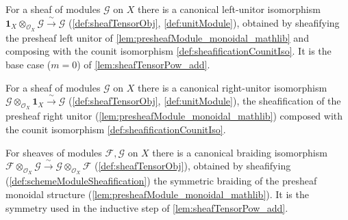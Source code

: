 \begin{definition}
  \label{def:tensorObjUnitIso}
  For a sheaf of modules \(\mathcal{G}\) on \(X\) there is a canonical left-unitor
  isomorphism \(\mathbf{1}_X \otimes_{\mathcal{O}_X} \mathcal{G}
  \xrightarrow{\ \sim\ } \mathcal{G}\) (\cref{def:sheafTensorObj},
  \cref{def:unitModule}), obtained by sheafifying the presheaf left unitor of
  \cref{lem:presheafModule_monoidal_mathlib} and composing with the counit
  isomorphism \cref{def:sheafificationCounitIso}. It is the base case
  (\(m = 0\)) of \cref{lem:sheafTensorPow_add}.
\end{definition}

\begin{definition}
  \label{def:tensorObjRightUnitor}
  For a sheaf of modules \(\mathcal{G}\) on \(X\) there is a canonical right-unitor
  isomorphism \(\mathcal{G} \otimes_{\mathcal{O}_X} \mathbf{1}_X
  \xrightarrow{\ \sim\ } \mathcal{G}\) (\cref{def:sheafTensorObj},
  \cref{def:unitModule}), the sheafification of the presheaf right unitor
  (\cref{lem:presheafModule_monoidal_mathlib}) composed with the counit
  isomorphism \cref{def:sheafificationCounitIso}.
\end{definition}

\begin{definition}
  \label{def:tensorBraiding}
  For sheaves of modules \(\mathcal{F}, \mathcal{G}\) on \(X\) there is a canonical
  braiding isomorphism \(\mathcal{F} \otimes_{\mathcal{O}_X} \mathcal{G}
  \xrightarrow{\ \sim\ } \mathcal{G} \otimes_{\mathcal{O}_X} \mathcal{F}\)
  (\cref{def:sheafTensorObj}), obtained by sheafifying
  (\cref{def:schemeModuleSheafification}) the symmetric braiding of the presheaf
  monoidal structure (\cref{lem:presheafModule_monoidal_mathlib}). It is the
  symmetry used in the inductive step of \cref{lem:sheafTensorPow_add}.
\end{definition}

